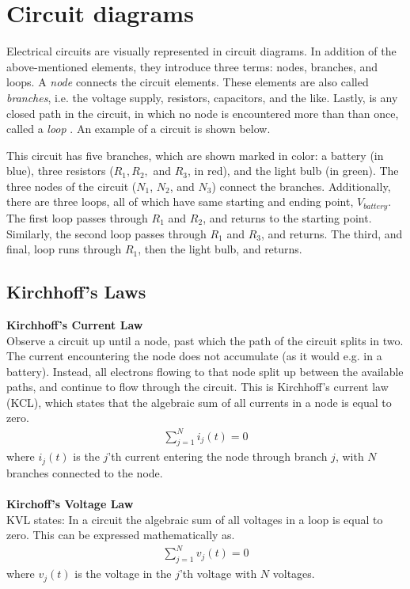 \section{Circuit diagrams}
Electrical circuits are visually represented in circuit diagrams. In addition of the above-mentioned elements, they introduce three terms: nodes, branches, and loops. A \textit{node} connects the circuit elements. These elements are also called \textit{branches}, i.e.  the voltage supply, resistors, capacitors, and the like. Lastly, is any closed path in the circuit, in which no node is encountered more than than once, called a \textit{loop} \cite[page~32]{bcircuit}. An example of a circuit is shown below.

\begin{figure}[H]
 
\end{figure}

This circuit has five branches, which are shown marked in color: a battery (in blue), three resistors ($R_1, R_2,$ and $R_3$, in red), and the light bulb (in green). The three nodes of the circuit ($N_1$, $N_2$, and $N_3$) connect the branches. Additionally, there are three loops, all of which have same starting and ending point, $V_{battery}$. The first loop passes through $R_1$ and $R_2$, and returns to the starting point. Similarly, the second loop passes through $R_1$ and $R_3$, and returns. The third, and final, loop runs through $R_1$, then the light bulb, and returns. 

\subsection{Kirchhoff's Laws}
\textbf{Kirchhoff's Current Law}
\\
Observe a circuit up until a node, past which the path of the circuit splits in two. The current encountering the node does not accumulate (as it would e.g. in a battery). Instead, all electrons flowing to that node split up between the available paths, and continue to flow through the circuit. This is Kirchhoff’s current law (KCL), which states that the algebraic sum of all currents in a node is equal to zero. 
\begin{align}
\sum_{j=1}^{N} i_{j}(t) = 0
\end{align}
where $i_{j}(t)$ is the $j$'th current entering the node through branch $j$, with $N$ branches connected to the node. \cite[page~32]{bcircuit}
\\
\\
\textbf{Kirchoff's Voltage Law}
\\
KVL states: In a circuit the algebraic sum of all voltages in a loop is equal to zero. This can be expressed mathematically  as.
\begin{align}
\sum_{j=1}^{N} v_{j}(t) = 0
\end{align}
where $v_{j}(t)$ is the voltage in the $j$'th voltage with $N$ voltages.\citep[page~34]{bcircuit}\\

